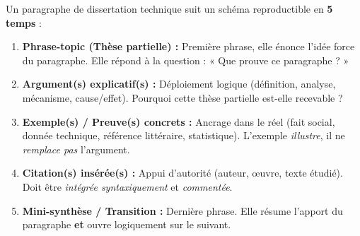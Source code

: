 \documentclass[11pt]{article}
\begin{document}
\begin{propriete}
Un paragraphe de dissertation technique suit un schéma reproductible en \textbf{5 temps} :
\begin{enumerate}
    \item \textbf{Phrase-topic (Thèse partielle) :} Première phrase, elle énonce l'idée force du paragraphe. Elle répond à la question : « Que prouve ce paragraphe ? »
    \item \textbf{Argument(s) explicatif(s) :} Déploiement logique (définition, analyse, mécanisme, cause/effet). Pourquoi cette thèse partielle est-elle recevable ?
    \item \textbf{Exemple(s) / Preuve(s) concrets :} Ancrage dans le réel (fait social, donnée technique, référence littéraire, statistique). L'exemple \emph{illustre}, il ne \emph{remplace pas} l'argument.
    \item \textbf{Citation(s) insérée(s) :} Appui d'autorité (auteur, œuvre, texte étudié). Doit être \emph{intégrée syntaxiquement} et \emph{commentée}.
    \item \textbf{Mini-synthèse / Transition :} Dernière phrase. Elle résume l'apport du paragraphe \textbf{et} ouvre logiquement sur le suivant.
\end{enumerate}
\end{propriete}
\end{document}
